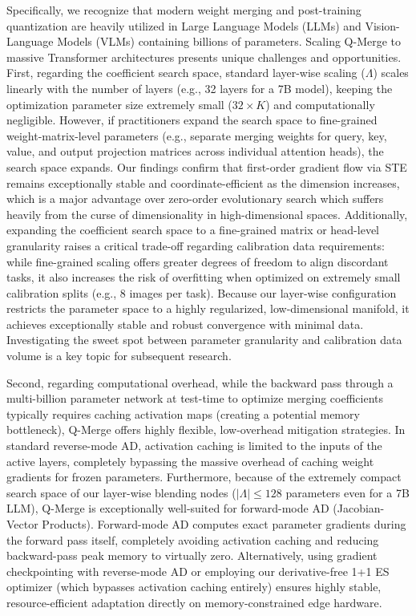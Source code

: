 Specifically, we recognize that modern weight merging and post-training quantization are heavily utilized in Large Language Models (LLMs) and Vision-Language Models (VLMs) containing billions of parameters. Scaling Q-Merge to massive Transformer architectures presents unique challenges and opportunities. First, regarding the coefficient search space, standard layer-wise scaling ($\Lambda$) scales linearly with the number of layers (e.g., 32 layers for a 7B model), keeping the optimization parameter size extremely small ($32 \times K$) and computationally negligible. However, if practitioners expand the search space to fine-grained weight-matrix-level parameters (e.g., separate merging weights for query, key, value, and output projection matrices across individual attention heads), the search space expands. Our findings confirm that first-order gradient flow via STE remains exceptionally stable and coordinate-efficient as the dimension increases, which is a major advantage over zero-order evolutionary search which suffers heavily from the curse of dimensionality in high-dimensional spaces. Additionally, expanding the coefficient search space to a fine-grained matrix or head-level granularity raises a critical trade-off regarding calibration data requirements: while fine-grained scaling offers greater degrees of freedom to align discordant tasks, it also increases the risk of overfitting when optimized on extremely small calibration splits (e.g., 8 images per task). Because our layer-wise configuration restricts the parameter space to a highly regularized, low-dimensional manifold, it achieves exceptionally stable and robust convergence with minimal data. Investigating the sweet spot between parameter granularity and calibration data volume is a key topic for subsequent research. 

Second, regarding computational overhead, while the backward pass through a multi-billion parameter network at test-time to optimize merging coefficients typically requires caching activation maps (creating a potential memory bottleneck), Q-Merge offers highly flexible, low-overhead mitigation strategies. In standard reverse-mode AD, activation caching is limited to the inputs of the active layers, completely bypassing the massive overhead of caching weight gradients for frozen parameters. Furthermore, because of the extremely compact search space of our layer-wise blending nodes ($|\Lambda| \le 128$ parameters even for a 7B LLM), Q-Merge is exceptionally well-suited for forward-mode AD (Jacobian-Vector Products). Forward-mode AD computes exact parameter gradients during the forward pass itself, completely avoiding activation caching and reducing backward-pass peak memory to virtually zero. Alternatively, using gradient checkpointing with reverse-mode AD or employing our derivative-free 1+1 ES optimizer (which bypasses activation caching entirely) ensures highly stable, resource-efficient adaptation directly on memory-constrained edge hardware.

